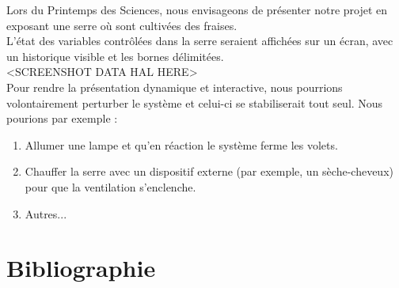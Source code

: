 \documentclass[a4paper,10pt]{article}
\begin{document}
Lors du Printemps des Sciences, nous envisageons de présenter notre projet en exposant une serre où sont cultivées des fraises. \\

L'état des variables contrôlées dans la serre seraient affichées sur un écran, avec un historique visible et les bornes délimitées. \\

<SCREENSHOT DATA HAL HERE> \\

Pour rendre la présentation dynamique et interactive, nous pourrions volontairement perturber le système et celui-ci se stabiliserait tout seul. Nous pourions par exemple :
\begin{enumerate}
	\item Allumer une lampe et qu'en réaction le système ferme les volets.
	\item Chauffer la serre avec un dispositif externe (par exemple, un sèche-cheveux) pour que la ventilation s'enclenche.
	\item Autres... \\
\end{enumerate}

\section{Bibliographie}
\end{document}
